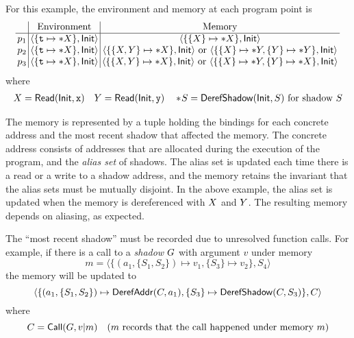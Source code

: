 \documentclass{article}
\begin{document}
For this example, the environment and memory at each program point is
\[
  \setlength{\arraycolsep}{2pt}
  \begin{array}{c|c|c}
              & \text{Environment}                                      & \text{Memory}                                                                                                                                                                           \\
    \hline
    \ppoint_1 & \langle\{\texttt{t}\mapsto*\abbrtext{X}\},\InitE\rangle & \langle\{\{\abbrtext{X}\}\mapsto*\abbrtext{X}\},\InitE\rangle                                                                                                                           \\
    \ppoint_2 & \langle\{\texttt{t}\mapsto*\abbrtext{X}\},\InitE\rangle & \langle\{\{\abbrtext{X},\abbrtext{Y}\}\mapsto*\abbrtext{X}\},\InitE\rangle\text{ or }\langle\{\{\abbrtext{X}\}\mapsto*\abbrtext{Y},\{\abbrtext{Y}\}\mapsto*\abbrtext{Y}\},\InitE\rangle \\
    \ppoint_3 & \langle\{\texttt{t}\mapsto*\abbrtext{X}\},\InitE\rangle & \langle\{\{\abbrtext{X},\abbrtext{Y}\}\mapsto*\abbrtext{X}\},\InitE\rangle\text{ or }\langle\{\{\abbrtext{X}\}\mapsto*\abbrtext{Y},\{\abbrtext{Y}\}\mapsto*\abbrtext{X}\},\InitE\rangle
  \end{array}
\]
where
\begin{align*}
  {X}=\mathsf{Read}(\mathsf{Init},\texttt{x})\quad{Y}=\mathsf{Read}(\mathsf{Init},\texttt{y})\quad*\!S=\mathsf{DerefShadow}(\mathsf{Init},S)\text{ for shadow }S
\end{align*}

The memory is represented by a tuple holding the bindings for each concrete address
and the most recent shadow that affected the memory.
The concrete address consists of addresses that are allocated during the execution
of the program, and the \emph{alias set} of shadows.
The alias set is updated each time there is a read or a write to a shadow address,
and the memory retains the invariant that the alias sets must be mutually disjoint.
In the above example, the alias set is updated when the memory is dereferenced with
${X}$ and ${Y}$. The resulting memory depends on aliasing, as expected.

The ``most recent shadow'' must be recorded due to unresolved function calls.
For example, if there is a call to a \emph{shadow} ${G}$ with argument $v$ under memory
\[m=\langle\{(a_1,\{S_1,S_2\})\mapsto v_1,\{S_3\}\mapsto v_2\},S_4\rangle\]
the memory will be updated to
\[\langle\{(a_1,\{S_1,S_2\})\mapsto\mathsf{DerefAddr}({C},a_1),\{S_3\}\mapsto\mathsf{DerefShadow}({C},S_3)\},{C}\rangle\]
where
\[{C}=\mathsf{Call}({G},v|m)\quad(m\text{ records that the call happened under memory }m)\]
\end{document}
